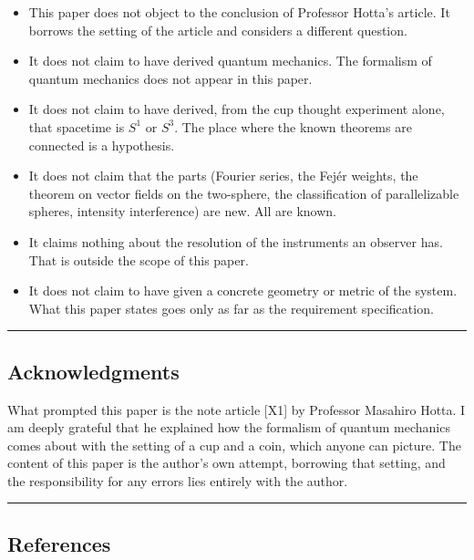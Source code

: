 \documentclass[
  a4paper,
]{article}
\providecommand{\tightlist}{%
  \setlength{\itemsep}{0pt}\setlength{\parskip}{0pt}}
\begin{document}
\begin{itemize}
\tightlist
\item
  This paper does not object to the conclusion of Professor Hotta's
  article. It borrows the setting of the article and considers a
  different question.
\item
  It does not claim to have derived quantum mechanics. The formalism of
  quantum mechanics does not appear in this paper.
\item
  It does not claim to have derived, from the cup thought experiment
  alone, that spacetime is \(S^1\) or \(S^3\). The place where the known
  theorems are connected is a hypothesis.
\item
  It does not claim that the parts (Fourier series, the Fejér weights,
  the theorem on vector fields on the two-sphere, the classification of
  parallelizable spheres, intensity interference) are new. All are
  known.
\item
  It claims nothing about the resolution of the instruments an observer
  has. That is outside the scope of this paper.
\item
  It does not claim to have given a concrete geometry or metric of the
  system. What this paper states goes only as far as the requirement
  specification.
\end{itemize}

\begin{center}\rule{0.5\linewidth}{0.5pt}\end{center}

\subsection{Acknowledgments}\label{acknowledgments}

What prompted this paper is the note article {[}X1{]} by Professor
Masahiro Hotta. I am deeply grateful that he explained how the formalism
of quantum mechanics comes about with the setting of a cup and a coin,
which anyone can picture. The content of this paper is the author's own
attempt, borrowing that setting, and the responsibility for any errors
lies entirely with the author.

\begin{center}\rule{0.5\linewidth}{0.5pt}\end{center}

\subsection{References}\label{references}
\end{document}
